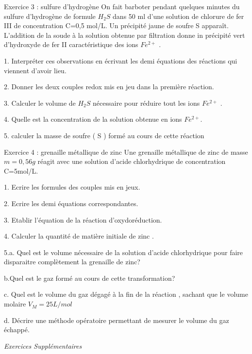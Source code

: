 \documentclass[12pt, french]{article}
\begin{document}
\begin{Box2}{Exercice 3 :  sulfure d’hydrogène }
On fait barboter pendant quelques minutes du sulfure d’hydrogène de formule $H_2S$ dans 50 ml d’une solution de
chlorure de fer III de concentration C=0,5 mol/L. Un précipité jaune de soufre S apparaît. L’addition de la soude à
   la solution obtenue par filtration donne in précipité vert d’hydroxyde de fer II caractéristique des ions $Fe^{2+}$ .

1. Interpréter ces observations en écrivant les demi équations des réactions qui viennent d’avoir lieu.

2. Donner les deux couples redox mis en jeu dans la première réaction.

   3. Calculer le volume de $H_2S$ nécessaire pour réduire tout les ions $Fe^{2+}$ .

   4. Quelle est la concentration de la solution obtenue en ions $Fe^{2+}$.

   5. calculer la masse de soufre ( S ) formé au cours de cette réaction
\end{Box2}

\begin{Box2}{Exercice 4 : grenaille métallique de zinc }
Une grenaille métallique de zinc de masse $m=0,56g$ réagit avec une solution d'acide chlorhydrique de
concentration C=5mol/L.

1. Ecrire les formules des couples mis en jeux.

   2. Ecrire les demi équations correspondantes.

   3. Etablir l'équation de la réaction d'oxydoréduction.

   4. Calculer la quantité de matière initiale de zinc .

   5.a. Quel est le volume nécessaire de la solution d'acide chlorhydrique pour faire disparaitre complètement la
grenaille de zinc?

   b.Quel est le gaz formé au cours de cette transformation?

   c. Quel est le volume du gaz dégagé à la fin de la réaction , sachant que le volume molaire $V_M=25L/mol$

   d. Décrire une méthode opératoire permettant de mesurer le volume du gaz échappé.  

\end{Box2}

\begin{center}
   \Large{ \em{Exercices Supplémentaires}}
\end{center}
\end{document}
